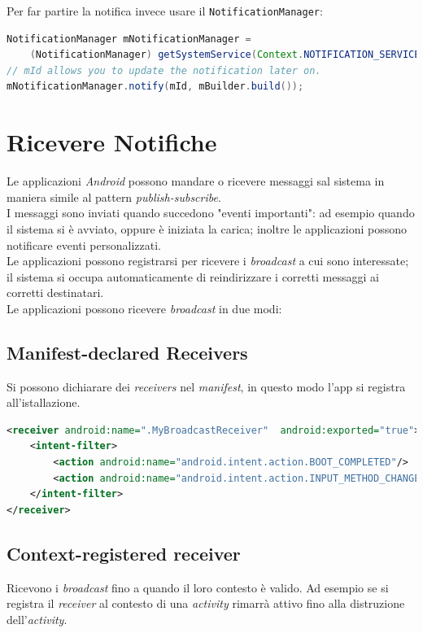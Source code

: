 \documentclass{book}
\begin{document}
Per far partire la notifica invece usare il \texttt{NotificationManager}:
\begin{lstlisting}[language=Java]
NotificationManager mNotificationManager =
    (NotificationManager) getSystemService(Context.NOTIFICATION_SERVICE);
// mId allows you to update the notification later on.
mNotificationManager.notify(mId, mBuilder.build());

\end{lstlisting}

\section{Ricevere Notifiche}
Le applicazioni \textit{Android} possono mandare o ricevere messaggi sal sistema in maniera simile al pattern \textit{publish-subscribe}.\\
I messaggi sono inviati quando succedono "eventi importanti": ad esempio quando il sistema si è avviato, oppure è iniziata la carica; inoltre le applicazioni possono notificare eventi personalizzati.\\
Le applicazioni possono registrarsi per ricevere i \textit{broadcast} a cui sono interessate; il sistema si occupa automaticamente di reindirizzare i corretti messaggi ai corretti destinatari.\\
Le applicazioni possono ricevere \textit{broadcast} in due modi:

\subsection{Manifest-declared Receivers}
Si possono dichiarare dei \textit{receivers} nel \textit{manifest}, in questo modo l'app si registra all'istallazione.
\begin{lstlisting}[language=XML]
<receiver android:name=".MyBroadcastReceiver"  android:exported="true">
    <intent-filter>
        <action android:name="android.intent.action.BOOT_COMPLETED"/>
        <action android:name="android.intent.action.INPUT_METHOD_CHANGED" />
    </intent-filter>
</receiver> 
\end{lstlisting}


\subsection{Context-registered receiver}
Ricevono i \textit{broadcast} fino a quando il loro contesto è valido. Ad esempio se si registra il \textit{receiver} al contesto di una \textit{activity} rimarrà attivo fino alla distruzione dell'\textit{activity}.\\
\end{document}
